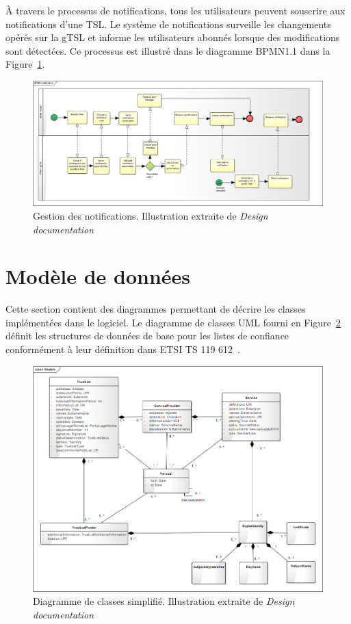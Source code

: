 \documentclass{tnreport}
\begin{document}
À travers le processus de notifications, tous les utilisateurs peuvent souscrire aux notifications d'une TSL. Le système de notifications surveille les changements opérés sur la gTSL et informe les utilisateurs abonnés lorsque des modifications sont détectées. Ce processus est illustré dans le diagramme BPMN1.1 dans la Figure~\ref{fig:notification-flow}.

\begin{figure}[h]
	\centering
	\includegraphics[scale=0.33]{figures/notification-flow}
	\caption{Gestion des notifications. Illustration extraite de \textit{Design documentation}~\cite{design-document}}
	\label{fig:notification-flow}
\end{figure}

\section{Modèle de données}

Cette section contient des diagrammes permettant de décrire les classes implémentées dans le logiciel. Le diagramme de classes UML fourni en Figure~\ref{fig:model} définit les structures de données de base pour les listes de confiance conformément à leur définition dans ETSI TS 119 612~\cite{ETSITS119612}.

\begin{figure}[h]
	\centering
	\includegraphics[scale=0.51]{figures/model}
	\caption{Diagramme de classes simplifié. Illustration extraite de \textit{Design documentation}~\cite{design-document}}
	\label{fig:model}
\end{figure}
\end{document}
